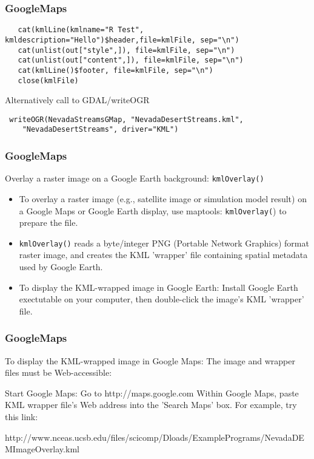 \documentclass{beamer}
\begin{document}
\begin{frame}[fragile]
\frametitle{GoogleMaps}
\begin{framed}
\begin{verbatim}
   cat(kmlLine(kmlname="R Test", kmldescription="Hello")$header,file=kmlFile, sep="\n")
   cat(unlist(out["style",]), file=kmlFile, sep="\n")
   cat(unlist(out["content",]), file=kmlFile, sep="\n")
   cat(kmlLine()$footer, file=kmlFile, sep="\n")
   close(kmlFile)
\end{verbatim}
\end{framed}
Alternatively call to GDAL/writeOGR 
\begin{framed}
\begin{verbatim}
 writeOGR(NevadaStreamsGMap, "NevadaDesertStreams.kml", 
    "NevadaDesertStreams", driver="KML")                         
\end{verbatim}
\end{framed}


\end{frame}
\begin{frame}[fragile]
\frametitle{GoogleMaps}
Overlay a raster image on a Google Earth background: \texttt{kmlOverlay()}

\begin{itemize}
\item To overlay a raster image (e.g., satellite image or simulation model result) on a Google Maps or Google Earth display, use maptools: \texttt{kmlOverlay(}) to prepare the file.

\item  \texttt{kmlOverlay()} reads a byte/integer PNG (Portable Network Graphics) format raster image, and creates the KML 'wrapper' file containing spatial metadata used by Google Earth.
\item  
To display the KML-wrapped image in Google Earth: Install Google Earth exectutable on your computer, then double-click the image's KML 'wrapper' file.
\end{itemize}
\end{frame}
\begin{frame}[fragile]
\frametitle{GoogleMaps}
To display the KML-wrapped image in Google Maps: The image and wrapper files must be Web-accessible:

Start Google Maps: Go to http://maps.google.com
Within Google Maps, paste KML wrapper file's Web address into the 'Search Maps' box.
For example, try this link:

http://www.nceas.ucsb.edu/files/scicomp/Dloads/ExamplePrograms/NevadaDEMImageOverlay.kml
\end{frame}
\end{document}
